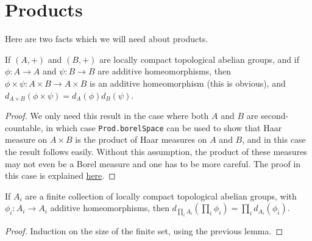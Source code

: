 
\section{Products}

Here are two facts which we will need about products.

\begin{lemma}
  \label{addHaarScalarFactor_prod}
  If $(A,+)$ and $(B,+)$ are locally compact topological abelian groups,
  and if $\phi:A\to A$ and $\psi:B\to B$ are additive homeomorphisms,
  then $\phi\times\psi:A\times B\to A\times B$ is an additive homeomorphism (this is
  obvious), and
  $d_{A\times B}(\phi\times\psi)=d_A(\phi)d_B(\psi)$.
\end{lemma}
\begin{proof}
  We only need this result in the case where both $A$ and $B$ are second-countable, in which case
  {\tt Prod.borelSpace} can be used to show that Haar measure on $A\times B$ is the product of
  Haar measures on $A$ and $B$, and in this case the result follows easily. Without this assumption,
  the product of these measures may not even be a Borel measure and one has to be more careful.
  The proof in this case is explained \href{https://leanprover.zulipchat.com/#narrow/channel/116395-maths/topic/Product.20of.20Borel.20spaces/near/487257981}{here}.
\end{proof}

\begin{lemma}
  \label{addHaarScalarFactor_pi_finite}
  If $A_i$ are a finite collection of locally compact topological abelian groups,
  with $\phi_i:A_i\to A_i$ additive homeomorphisms, then $d_{\prod_i A_i}(\prod_i\phi_i)=\prod_i d_{A_i}(\phi_i)$.
\end{lemma}
\begin{proof}
  Induction on the size of the finite set, using the previous lemma.
\end{proof}

